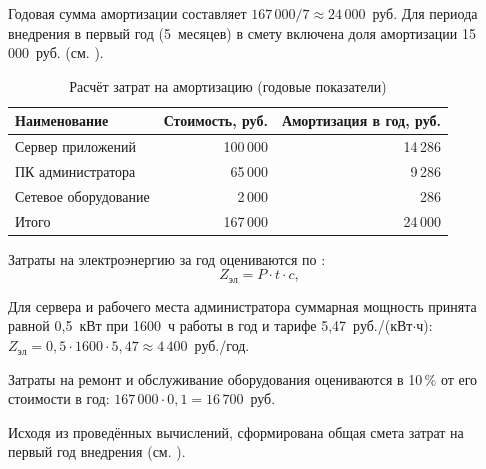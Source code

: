 Годовая сумма амортизации составляет $167\,000 / 7 \approx 24\,000$~руб. Для периода внедрения в первый год (5~месяцев) в смету включена доля амортизации 15\,000~руб. (см. ).

\begin{table}[H]
	\centering
	\caption{Расчёт затрат на амортизацию (годовые показатели)}
	\label{tab:depreciation}
	\begin{tabularx}{\textwidth}{|>{\raggedright\arraybackslash}X|r|r|}
		\hline
		\textbf{Наименование} & \textbf{Стоимость, руб.} & \textbf{Амортизация в год, руб.} \\
		\hline
		Сервер приложений & 100\,000 & 14\,286 \\
		\hline
		ПК администратора & 65\,000 & 9\,286 \\
		\hline
		Сетевое оборудование & 2\,000 & 286 \\
		\hline
		Итого & 167\,000 & 24\,000 \\
		\hline
	\end{tabularx}
\end{table}

Затраты на электроэнергию за год оцениваются по :
\begin{equation}
	Z_{\mathrm{эл}} = P \cdot t \cdot c,
	\label{eq:energy-cost}
\end{equation}

Для сервера и рабочего места администратора суммарная мощность принята равной 0{,}5~кВт при 1600~ч работы в год и тарифе 5{,}47~руб./(кВт$\cdot$ч):
$Z_{\mathrm{эл}} = 0{,}5 \cdot 1600 \cdot 5{,}47 \approx 4\,400$~руб./год.

Затраты на ремонт и обслуживание оборудования оцениваются в 10\,\% от его стоимости в год: $167\,000 \cdot 0{,}1 = 16\,700$~руб.

Исходя из проведённых вычислений, сформирована общая смета затрат на первый год внедрения (см. ).


